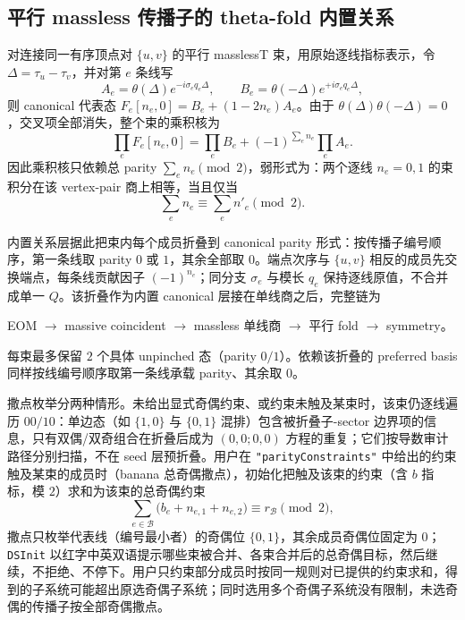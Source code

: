 ﻿\documentclass[a4paper,11pt]{article}
\begin{document}
\subsection{平行 massless 传播子的 theta-fold 内置关系}
\label{manualThetaFold}

对连接同一有序顶点对 $\{u,v\}$ 的平行 masslessT 束，用原始逐线指标表示，令
$\Delta=\tau_u-\tau_v$，并对第 $e$ 条线写
\begin{equation}
 A_e=\theta(\Delta)e^{-i\sigma_e q_e\Delta},
 \qquad
 B_e=\theta(-\Delta)e^{+i\sigma_e q_e\Delta},
 \label{foldParts}
\end{equation}
则 canonical 代表态 $F_e[n_e,0]=B_e+(1-2n_e)A_e$。由于
$\theta(\Delta)\theta(-\Delta)=0$，交叉项全部消失，整个束的乘积核为
\begin{equation}
 \prod_e F_e[n_e,0]
 =\prod_e B_e+(-1)^{\sum_en_e}\prod_eA_e.
 \label{foldProduct}
\end{equation}
因此乘积核只依赖总 parity $\sum_en_e\pmod 2$，弱形式为：两个逐线 $n_e=0,1$ 的束积分在该 vertex-pair 商上相等，当且仅当
\begin{equation}
 \sum_en_e\equiv\sum_en'_e\pmod 2.
\end{equation}

内置关系层据此把束内每个成员折叠到 canonical parity 形式：按传播子编号顺序，第一条线取 parity $0$ 或 $1$，其余全部取 $0$。端点次序与 $\{u,v\}$ 相反的成员先交换端点，每条线贡献因子 $(-1)^{n_e}$；同分支 $\sigma_e$ 与模长 $q_e$ 保持逐线原值，不合并成单一 $Q$。该折叠作为内置 canonical 层接在单线商之后，完整链为
\begin{center}
EOM $\to$ massive coincident $\to$ massless 单线商 $\to$ 平行 fold $\to$ symmetry。
\end{center}
每束最多保留 $2$ 个具体 unpinched 态（parity $0/1$）。依赖该折叠的 preferred basis 同样按线编号顺序取第一条线承载 parity、其余取 $0$。

撒点枚举分两种情形。未给出显式奇偶约束、或约束未触及某束时，该束仍逐线遍历 $00/10$：单边态（如 $\{1,0\}$ 与 $\{0,1\}$ 混排）包含被折叠子-sector 边界项的信息，只有双偶/双奇组合在折叠后成为 $(0,0;0,0)$ 方程的重复；它们按导数审计路径分别扫描，不在 seed 层预折叠。用户在 \texttt{"parityConstraints"} 中给出的约束触及某束的成员时（banana 总奇偶撒点），初始化把触及该束的约束（含 $b$ 指标，模 $2$）求和为该束的总奇偶约束
\begin{equation}
 \sum_{e\in\mathcal B}\bigl(b_e+n_{e,1}+n_{e,2}\bigr)\equiv r_{\mathcal B}\pmod 2,
 \label{bundleTotalParityManual}
\end{equation}
撒点只枚举代表线（编号最小者）的奇偶位 $\{0,1\}$，其余成员奇偶位固定为 $0$；\texttt{DSInit} 以红字中英双语提示哪些束被合并、各束合并后的总奇偶目标，然后继续，不拒绝、不停下。用户只约束部分成员时按同一规则对已提供的约束求和，得到的子系统可能超出原选奇偶子系统；同时选用多个奇偶子系统没有限制，未选奇偶的传播子按全部奇偶撒点。
\end{document}
